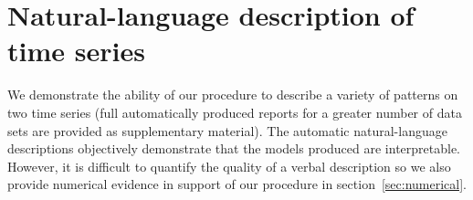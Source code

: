 \documentclass{article}
\def\eg{e.g.\ }
\begin{document}









\section{Natural-language description of time series}
\label{sec:examples}
We demonstrate the ability of our procedure to describe a variety of patterns on two time series (full automatically produced reports for a greater number of data sets are provided as supplementary material).
The automatic natural-language descriptions objectively demonstrate that the models produced are interpretable.
However, it is difficult to quantify the quality of a verbal description so we also provide numerical evidence in support of our procedure in section~\ref{sec:numerical}.
\end{document}
